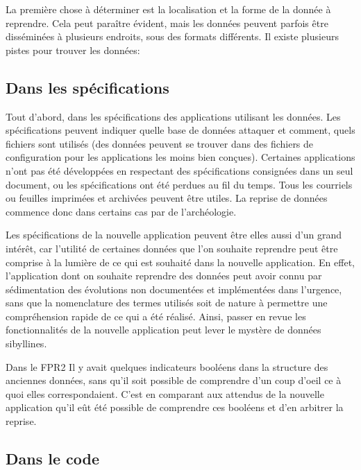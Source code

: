 \documentclass{book}
\begin{document}
La première chose à déterminer est la localisation et la forme de la donnée à reprendre. Cela peut paraître évident, mais les données peuvent parfois être disséminées à plusieurs endroits, sous des formats différents.
Il existe plusieurs pistes pour trouver les données:

\subsection{Dans les spécifications}

Tout d'abord, dans les spécifications des applications utilisant les données. Les spécifications peuvent indiquer quelle base de données attaquer et comment, quels fichiers sont utilisés (des données peuvent se trouver dans des fichiers de configuration pour les applications les moins bien conçues). Certaines applications n'ont pas été développées en respectant des spécifications consignées dans un seul document, ou les spécifications ont été perdues au fil du temps. Tous les courriels ou feuilles imprimées et archivées peuvent être utiles. La reprise de données commence donc dans certains cas par de l'archéologie.

Les spécifications de la nouvelle application peuvent être elles aussi d'un grand intérêt, car l'utilité de certaines données que l'on souhaite reprendre peut être comprise à la lumière de ce qui est souhaité dans la nouvelle application. En effet, l'application dont on souhaite reprendre des données peut avoir connu par sédimentation des évolutions non documentées et implémentées dans l'urgence, sans que la nomenclature des termes utilisés soit de nature à permettre une compréhension rapide de ce qui a été réalisé. Ainsi, passer en revue les fonctionnalités de la nouvelle application peut lever le mystère de données sibyllines.

\begin{bclogo}[arrondi = 0.1, couleur = blue!10, logo = \bcinfo]{Dans le FPR2}
Il y avait quelques indicateurs booléens dans la structure des anciennes données, sans qu'il soit possible de comprendre d'un coup d'oeil ce à quoi elles correspondaient. C'est en comparant aux attendus de la nouvelle application qu'il eût été possible de comprendre ces booléens et d'en arbitrer la reprise.
\end{bclogo}

\subsection{Dans le code}
\end{document}
